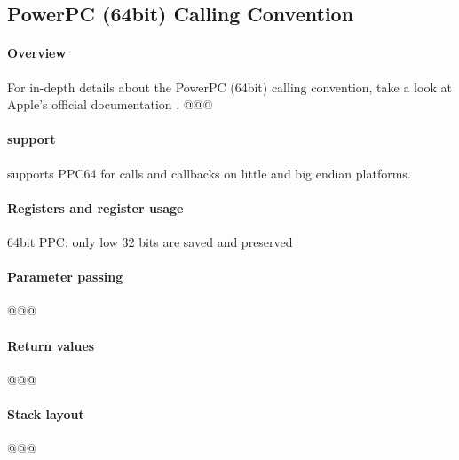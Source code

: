%
%
%
%

\subsection{PowerPC (64bit) Calling Convention}



\paragraph{Overview}

For in-depth details about the PowerPC (64bit) calling convention, take a look
at Apple's official documentation \cite{ppcMacOSX}.
@@@


\paragraph{ support}

 supports PPC64 for calls and callbacks on little and big endian platforms.


\paragraph{Registers and register usage}

64bit PPC: only low 32 bits are saved and preserved


\paragraph{Parameter passing}

@@@


\paragraph{Return values}

@@@


\paragraph{Stack layout}

@@@


